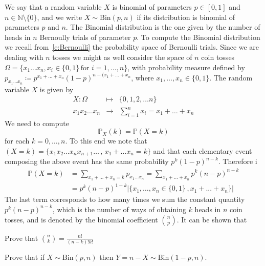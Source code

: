 	\begin{example}	
		We say that a random variable $X$ is binomial of parameters $p \in [0,1]$ and $n \in \mathbb N \setminus\{0\}$, and we write $X \sim \text{Bin}(p,n)$ if its distribution is binomial of parameters $p$ and $n$. The Binomial distribution is the one given by the number of heads in $n$ Bernoully trials of parameter $p$. To compute the Binomial distribution we recall from~\ref{e:Bernoulli} the probability space of Bernoulli trials. Since we are dealing with $n$ tosses we might as well consider the space of $n$ coin tosses $\Omega = \{x_1...x_n, x_  i \in  \{0,1\} \,\textrm{for $i = 1,\ldots, n$}\}$, with probability measure defined by $p_{x_1\ldots x_n} \coloneqq p^{x_1 + \ldots + x_n}(1-p)^{n - (x_1 + \ldots + x_n }$, where $x_1,\ldots , x_n \in \{0,1\}$.  The random variable $X$ is given by 
		\begin{equation}
		\begin{array}{ccc}
		X: \Omega & \mapsto & \{0,1,2,\ldots n\}\\
			x_1x_2 \ldots x_n & \to & \sum_{i = 1 }^n x_i = x_1 + \ldots + x_n
		\end{array} 
		\end{equation}
	We need to compute
		\begin{equation}
		\mathbb P_X({k}) = \mathbb P( X = k)
		\end{equation}
		for each $k = 0, \ldots, n$. To this end we note that $(X = k) = \{x_1x_2\ldots x_n x_{n + 1} \ldots \, , \, x_1 + \ldots x_n = k \}$ and that each elementary event composing the above event has the same probability $p^k(1-p)^{n-k}$. Therefore 
	i
	\begin{equation}
		\label{e:Binomial1}
		\begin{split}
			\mathbb P(X = k )&  = \sum_{ x_1 + \ldots + x_n = k  } p_{x_1\ldots x_n} = \sum_{x_1 + \ldots + x_n } p^{ k }(n- p)^{n - k} \\
				& = p^k(n - p)^{1-k} \left|\{ x_1, \ldots, x_n \in \{0,1\}\,, x_1 + ... + x_n\}\right|
			\end{split}
		\end{equation} 
	The last term corresponds to how many times we sum the constant quantity $p^k(n-p)^{n-k}$, which is the number of ways of obtaining $k$ heads in $n$ coin tosses, and is denoted by the binomial coefficient ${n \choose p}$. It can be shown that 
			\begin{ExerciseList}
						\Exercise Prove that ${n\choose k } = \frac{n!}{(n-k)!k!}$

	
					\Exercise Prove that if $X \sim \text{Bin}(p,n)$ then $Y = n - X \sim \text{Bin}(1- p, n )$. 
	\end{ExerciseList}
		\end{example}

